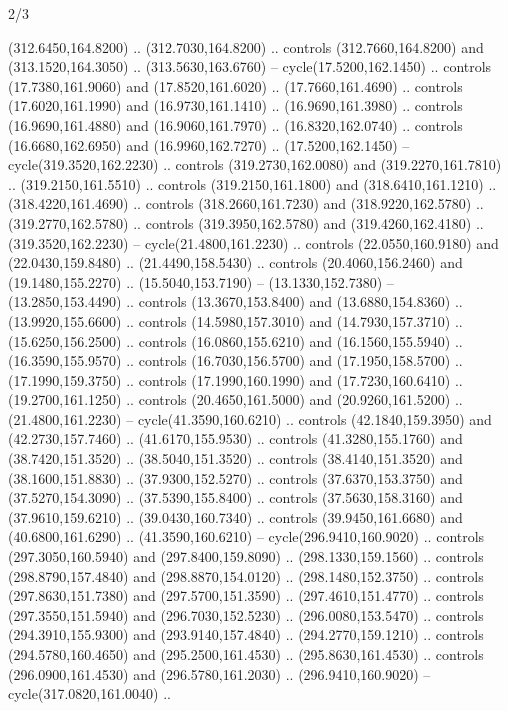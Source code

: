\begin{flagdescription}{2/3}
\begin{scope}[xshift=0.5\flaglength,yshift=0.5\flagwidth,scale=\stretchfactor]
\begin{scope}[scale=0.001645\flagwidth,yshift=65mm,xshift=-63mm]
\begin{scope}[y=0.80pt, x=0.80pt, yscale=-1,]
\begin{scope}[cm={{1.33333,0.0,0.0,1.33333,(0.0,1e-05)}}]
  (312.6450,164.8200) .. (312.7030,164.8200) .. controls (312.7660,164.8200) and
  (313.1520,164.3050) .. (313.5630,163.6760) -- cycle(17.5200,162.1450) ..
  controls (17.7380,161.9060) and (17.8520,161.6020) .. (17.7660,161.4690) ..
  controls (17.6020,161.1990) and (16.9730,161.1410) .. (16.9690,161.3980) ..
  controls (16.9690,161.4880) and (16.9060,161.7970) .. (16.8320,162.0740) ..
  controls (16.6680,162.6950) and (16.9960,162.7270) .. (17.5200,162.1450) --
  cycle(319.3520,162.2230) .. controls (319.2730,162.0080) and
  (319.2270,161.7810) .. (319.2150,161.5510) .. controls (319.2150,161.1800) and
  (318.6410,161.1210) .. (318.4220,161.4690) .. controls (318.2660,161.7230) and
  (318.9220,162.5780) .. (319.2770,162.5780) .. controls (319.3950,162.5780) and
  (319.4260,162.4180) .. (319.3520,162.2230) -- cycle(21.4800,161.2230) ..
  controls (22.0550,160.9180) and (22.0430,159.8480) .. (21.4490,158.5430) ..
  controls (20.4060,156.2460) and (19.1480,155.2270) .. (15.5040,153.7190) --
  (13.1330,152.7380) -- (13.2850,153.4490) .. controls (13.3670,153.8400) and
  (13.6880,154.8360) .. (13.9920,155.6600) .. controls (14.5980,157.3010) and
  (14.7930,157.3710) .. (15.6250,156.2500) .. controls (16.0860,155.6210) and
  (16.1560,155.5940) .. (16.3590,155.9570) .. controls (16.7030,156.5700) and
  (17.1950,158.5700) .. (17.1990,159.3750) .. controls (17.1990,160.1990) and
  (17.7230,160.6410) .. (19.2700,161.1250) .. controls (20.4650,161.5000) and
  (20.9260,161.5200) .. (21.4800,161.2230) -- cycle(41.3590,160.6210) ..
  controls (42.1840,159.3950) and (42.2730,157.7460) .. (41.6170,155.9530) ..
  controls (41.3280,155.1760) and (38.7420,151.3520) .. (38.5040,151.3520) ..
  controls (38.4140,151.3520) and (38.1600,151.8830) .. (37.9300,152.5270) ..
  controls (37.6370,153.3750) and (37.5270,154.3090) .. (37.5390,155.8400) ..
  controls (37.5630,158.3160) and (37.9610,159.6210) .. (39.0430,160.7340) ..
  controls (39.9450,161.6680) and (40.6800,161.6290) .. (41.3590,160.6210) --
  cycle(296.9410,160.9020) .. controls (297.3050,160.5940) and
  (297.8400,159.8090) .. (298.1330,159.1560) .. controls (298.8790,157.4840) and
  (298.8870,154.0120) .. (298.1480,152.3750) .. controls (297.8630,151.7380) and
  (297.5700,151.3590) .. (297.4610,151.4770) .. controls (297.3550,151.5940) and
  (296.7030,152.5230) .. (296.0080,153.5470) .. controls (294.3910,155.9300) and
  (293.9140,157.4840) .. (294.2770,159.1210) .. controls (294.5780,160.4650) and
  (295.2500,161.4530) .. (295.8630,161.4530) .. controls (296.0900,161.4530) and
  (296.5780,161.2030) .. (296.9410,160.9020) -- cycle(317.0820,161.0040) ..

\end{scope}
\end{scope}
\end{scope}
\end{scope}
\end{flagdescription}
